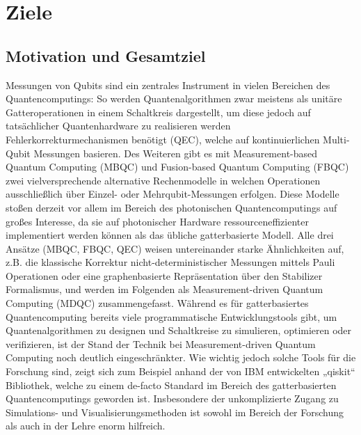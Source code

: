 \documentclass[11pt, a4paper]{article}
\newcommand{\instruction}[1]{{}}
\begin{document}
\section{Ziele}

\subsection{Motivation und Gesamtziel}

\instruction{Ca. 1 Seite}
\instruction{Übergeordnetes Ziel des Verbundprojekts}
\instruction{Welches konkrete Problem soll gelöst werden?}
\instruction{Welche Endanwender und Branchen profitieren von der Lösung?}
\instruction{Welchen Vorteil bietet die vorgeschlagene Lösung in der praktischen Anwendung gegenüber anderen Ansätzen?}

Messungen von Qubits sind ein zentrales Instrument in vielen Bereichen
des Quantencomputings: So werden Quantenalgorithmen zwar meistens als
unitäre Gatteroperationen in einem Schaltkreis dargestellt, um diese
jedoch auf tatsächlicher Quantenhardware zu realisieren werden
Fehlerkorrekturmechanismen benötigt (QEC), welche auf kontinuierlichen
Multi-Qubit Messungen basieren. Des Weiteren gibt es mit
Measurement-based Quantum Computing (MBQC) und Fusion-based Quantum
Computing (FBQC) zwei vielversprechende alternative Rechenmodelle in
welchen Operationen ausschließlich über Einzel- oder
Mehrqubit-Messungen erfolgen. Diese Modelle stoßen derzeit vor allem
im Bereich des photonischen Quantencomputings auf großes Interesse, da
sie auf photonischer Hardware ressourceneffizienter implementiert
werden können als das übliche gatterbasierte Modell. Alle drei Ansätze
(MBQC, FBQC, QEC) weisen untereinander starke Ähnlichkeiten auf,
z.B. die klassische Korrektur nicht-deterministischer Messungen
mittels Pauli Operationen oder eine graphenbasierte Repräsentation
über den Stabilizer Formalismus, und werden im Folgenden als
Measurement-driven Quantum Computing (MDQC) zusammengefasst.  Während
es für gatterbasiertes Quantencomputing bereits viele programmatische
Entwicklungstools gibt, um Quantenalgorithmen zu designen und
Schaltkreise zu simulieren, optimieren oder verifizieren, ist der
Stand der Technik bei Measurement-driven Quantum Computing noch
deutlich eingeschränkter. Wie wichtig jedoch solche Tools für die
Forschung sind, zeigt sich zum Beispiel anhand der von IBM
entwickelten „qiskit“ Bibliothek, welche zu einem de-facto Standard im
Bereich des gatterbasierten Quantencomputings geworden
ist. Insbesondere der unkomplizierte Zugang zu Simulations- und
Visualisierungsmethoden ist sowohl im Bereich der Forschung als auch
in der Lehre enorm hilfreich.
\end{document}
